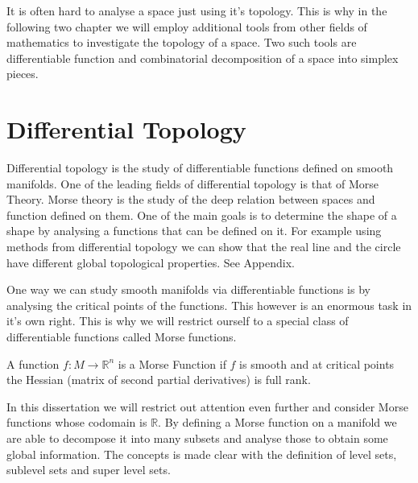 It is often hard to analyse a space just using it's topology. This is why in the following two chapter we will employ additional tools from other fields of mathematics to investigate the topology of a space. Two such tools are differentiable function and combinatorial decomposition of a space into simplex pieces.













\section{Differential Topology}

Differential topology is the study of differentiable functions defined on smooth manifolds. One of the leading fields of differential topology is that of Morse Theory. Morse theory is the study of the deep relation between spaces and function defined on them. One of the main goals is to determine the shape of a shape by analysing a functions that can be defined on it. For example using methods from differential topology we can show that the real line and the circle have different global topological properties. See Appendix.

One way we can study smooth manifolds via differentiable functions is by analysing the critical points of the functions. This however is an enormous task in it's own right. This is why we will restrict ourself to a special class of differentiable functions called Morse functions.


\begin{defn} A function $f: M \to \mathbb{R}^n$ is a Morse Function if $f$ is smooth and at critical points the Hessian (matrix of second partial derivatives) is full rank.   \end{defn}

In this dissertation we will restrict out attention even further and consider Morse functions whose codomain is $\mathbb{R}$. By defining a Morse function on a manifold we are able to decompose it into many subsets and analyse those to obtain some global information. The concepts is made clear with the definition of level sets, sublevel sets and super level sets.

